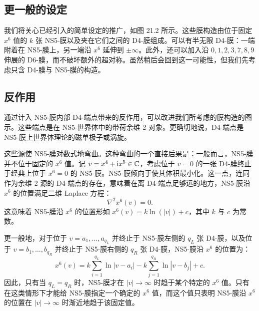 \subsection{更一般的设定}

我们将关心已经引入的简单设定的推广，如图 21.2 所示。这些膜构造由位于固定 $x^6$ 值的 $k$ 张 NS5-膜以及夹在它们之间的 D4-膜组成。可以有半无限 D4-膜：一端附着在 NS5-膜上，另一端沿 $x^6$ 延伸到 $\pm\infty$。此外，还可以加入沿 $0,1,2,3,7,8,9$ 伸展的 D6-膜，而不破坏额外的超对称。虽然稍后会回到这一可能性，但我们先考虑只含 D4-膜与 NS5-膜的构造。

\subsection{反作用}

通过计入 NS5-膜内部 D4-端点带来的反作用，可以改进我们所考虑的膜构造的图示。这些端点是在 NS5-世界体中的带荷余维 2 对象。更确切地说，D4-端点是 NS5-膜上世界体理论的磁单极子或涡旋。


这些源使 NS5-膜对数式地弯曲。这种弯曲的一个直接后果是：一般而言，NS5-膜并不位于固定的 $x^6$ 值。记 $v=x^4+\mathrm{i} x^5\in\mathbb{C}$，考虑位于 $v=0$ 的一张 D4-膜终止于经典上位于 $x^6=0$ 的 NS5-膜。NS5-膜倾向于使其体积最小化。这一点，连同作为余维 2 源的 D4-端点的存在，意味着在离 D4-端点足够远的地方，NS5-膜沿 $x^6$ 的位置满足二维 Laplace 方程：
\[
\nabla^2x^6(v)=0.
\]
这意味着 NS5-膜沿 $x^6$ 的位置形如 $x^6(v)=k\ln(|v|)+c$，其中 $k$ 与 $c$ 为常数。

更一般地，对于位于 $v=a_1,\dots,a_{q_L}$ 并终止于 NS5-膜左侧的 $q_L$ 张 D4-膜，以及位于 $v=b_1,\dots,b_{q_R}$ 并终止于 NS5-膜右侧的 $q_R$ 张 D4-膜，NS5-膜沿 $x^6$ 的位置为：
\begin{equation}
x^6(v)=k\sum_{i=1}^{q_L}\ln|v-a_i|-k\sum_{j=1}^{q_R}\ln|v-b_j|+c.
\tag{21.1}
\end{equation}
因此，只有当 $q_L=q_R$ 时，NS5-膜才在 $|v|\to\infty$ 时趋于某个特定的 $x^6$ 值。只有在这类情形下才能给 NS5-膜指定一个确定的 $x^6$ 值，而这个值只表明 NS5-膜沿 $x^6$ 的位置在 $|v|\to\infty$ 时渐近地趋于该固定值。


